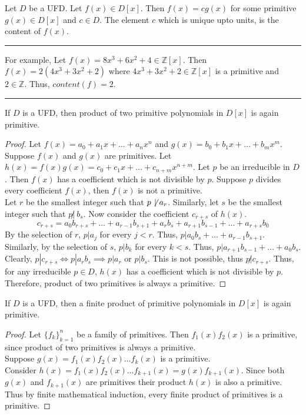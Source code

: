 \begin{definition}[content]
	Let $D$ be a UFD.
	Let $f(x) \in D[x]$.
	Then $f(x) = cg(x)$ for some primitive $g(x) \in D[x]$ and $c \in D$.
	The element $c$ which is unique upto units, is the content of $f(x)$.
\end{definition}
\hrule\vspace{1em}
	For example, Let $f(x) = 8x^3+6x^2+4 \in \mathbb{Z}[x]$.
	Then $f(x) = 2(4x^3+3x^2+2)$ where $4x^3+3x^2+2 \in \mathbb{Z}[x]$ is a primitive and $2 \in \mathbb{Z}$.
	Thus, $content(f) = 2$.
\hrule\vspace{1em}
\begin{lemma}[Gauss]
	If $D$ is a UFD, then product of two primitive polynomials in $D[x]$ is again primitive.
\end{lemma}
\begin{proof}
	Let $f(x) = a_0 + a_1x + \dots + a_nx^n$ and $g(x) = b_0 + b_1x + \dots + b_mx^m$.
	Suppose $f(x)$ and $g(x)$ are primitives.
	Let $h(x) = f(x)g(x) = c_0 + c_1x + \dots + c_{n+m}x^{n+m}$.
	Let $p$ be an irreducible in $D$.
	Then $f(x)$ has a coefficient which is not divisible by $p$.
	Suppose $p$ divides every coefficient $f(x)$, then $f(x)$ is not a primitive.\\

	Let $r$ be the smallest integer such that $p\not\!|\ a_r$.
	Similarly, let $s$ be the smallest integer such that $p\not|\ b_s$.
	Now consider the coefficient $c_{r+s}$ of $h(x)$.
	\[ c_{r+s} = a_0b_{r+s}+\dots+a_{r-1}b_{s+1}+a_rb_s+a_{r+1}b_{s-1}+\dots+a_{r+s}b_0 \]
	By the selection of $r$, $p | a_j$ for every $j < r$.
	Thus, $p | a_0b_s+\dots+a_{r-1}b_{s+1}$.
	Similarly, by the selection of $s$, $p | b_k$ for every $k < s$.
	Thus, $p | a_{r+1}b_{s-1}+\dots+a_0b_s$.
	Clearly, $p | c_{r+s} \iff p | a_rb_s \implies p|a_r \text{ or } p|b_s$.
	This is not possible, thus $p \not| c_{r+s}$.	
	Thus, for any irreducible $p \in D$, $h(x)$ has a coefficient which is not divisible by $p$.
	Therefore, product of two primitives is always a primitive.
\end{proof}

\begin{corollary}
	If $D$ is a UFD, then a finite product of primitive polynomials in $D[x]$ is again primitive.
\end{corollary}
\begin{proof}
	Let $\{f_k\}_{k=1}^n$ be a family of primitives.
	Then $f_1(x)f_2(x)$ is a primitive, since product of two primitives is always a primitive.\\

	Suppose $g(x) = f_1(x)f_2(x)\dots f_k(x)$ is a primitive.\\

	Consider $h(x) = f_1(x)f_2(x)\dots f_{k+1}(x) = g(x)f_{k+1}(x)$.
	Since both $g(x)$ and $f_{k+1}(x)$ are primitives their product $h(x)$ is also a primitive.\\

	Thus by finite mathematical induction, every finite product of primitives is a primitive.
\end{proof}


